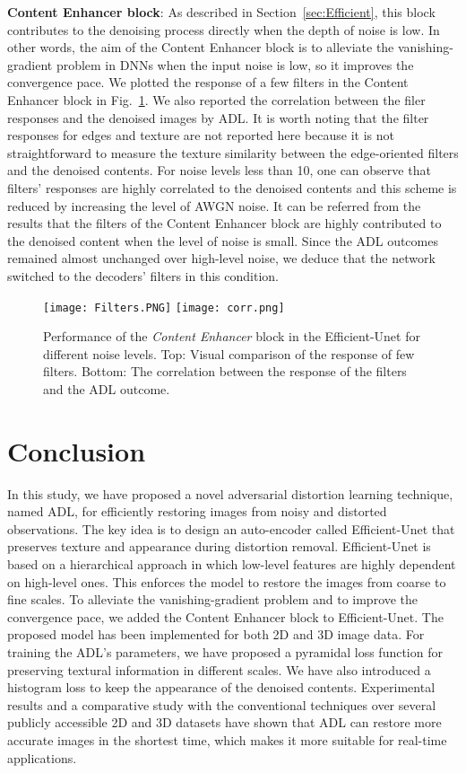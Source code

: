 \documentclass[journal,twoside,web]{ieeecolor}
\begin{document}
\textbf{Content Enhancer block}: As described in Section~\ref{sec:Efficient}, this block contributes to the denoising process directly when the depth of noise is low. In other words, the aim of the Content Enhancer block is to alleviate the vanishing-gradient problem in DNNs when the input noise is low, so it improves the convergence pace. 
We plotted the response of a few filters in the Content Enhancer block in Fig.~\ref{fig:ablationfig}. We also reported the correlation between the filer responses and the denoised images by ADL. It is worth noting that the filter responses for edges and texture are not reported here because it is not straightforward to measure the texture similarity between the edge-oriented filters and the denoised contents. For noise levels less than 10, one can observe that filters' responses are highly correlated to the denoised contents and this scheme is reduced by increasing the level of AWGN noise. It can be referred from the results that the filters of the Content Enhancer block are highly contributed to the denoised content when the level of noise is small. 
Since the ADL outcomes remained almost unchanged over high-level noise, we deduce that the network switched to the decoders' filters in this condition.
\begin{figure}
    \centering
    \texttt{[image: Filters.PNG]}
    \texttt{[image: corr.png]}
\caption{Performance of the \textit{Content Enhancer} block in the Efficient-Unet for different noise levels. Top: Visual comparison of the response of few filters. Bottom: The correlation between the response of the filters and the ADL outcome.}
\label{fig:ablationfig}
\end{figure}

\section{Conclusion}\label{sec:conclusion}
In this study, we have proposed a novel adversarial distortion learning technique, named ADL, for efficiently restoring images from noisy and distorted observations.
The key idea is to design an auto-encoder called Efficient-Unet that preserves texture and appearance during distortion removal.
Efficient-Unet is based on a hierarchical approach in which low-level features are highly dependent on high-level ones. This enforces the model to restore the images from coarse to fine scales. To alleviate the vanishing-gradient problem and to improve the convergence pace, we added the Content Enhancer block to Efficient-Unet. The proposed model has been implemented for both 2D and 3D image data.
For training the ADL's parameters, we have proposed a pyramidal loss function for preserving textural information in different scales.
We have also introduced a histogram loss to keep the appearance of the denoised contents. Experimental results and a comparative study with the conventional techniques over several publicly accessible 2D and 3D datasets have shown that ADL can restore more accurate images in the shortest time, which makes it more suitable for real-time applications.
\end{document}
